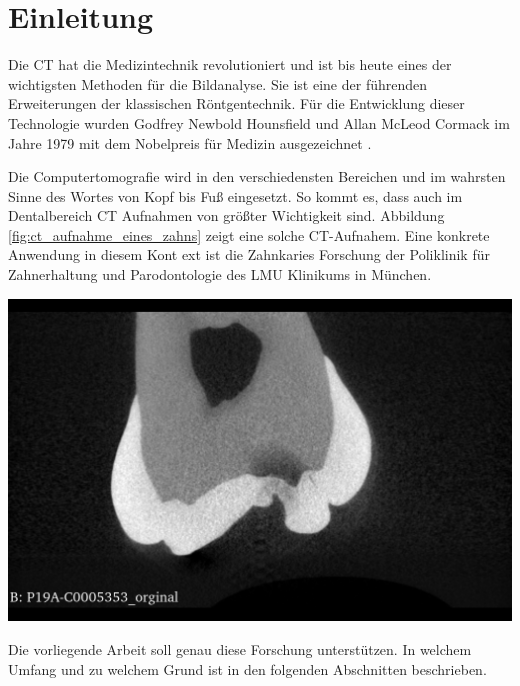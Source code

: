 \chapter{Einleitung}
\label{chap:einleitung} Die \ac{CT} hat die Medizintechnik revolutioniert und
ist bis heute eines der wichtigsten Methoden für die Bildanalyse. Sie ist eine der
führenden Erweiterungen der klassischen Röntgentechnik. Für die Entwicklung
dieser Technologie wurden Godfrey Newbold Hounsfield und Allan McLeod Cormack im
Jahre 1979 mit dem Nobelpreis für Medizin ausgezeichnet \citep[Seite12]{handels2000}.

\begin{minipage}{0.40\textwidth}
	Die Computertomografie wird in den verschiedensten Bereichen und im wahrsten Sinne
	des Wortes von Kopf bis Fuß eingesetzt. So kommt es, dass auch im Dentalbereich
	CT Aufnahmen von größter Wichtigkeit sind. Abbildung
	\ref{fig:ct_aufnahme_eines_zahns} zeigt eine solche CT-Aufnahem. Eine konkrete
	Anwendung in diesem Kont ext ist die Zahnkaries Forschung der Poliklinik für Zahnerhaltung
	und Parodontologie des LMU Klinikums in München.
\end{minipage}
\hfill
\begin{minipage}{0.50\textwidth}
	\centering
	\includegraphics[scale=0.2, width=\textwidth]{img/micro_ct_orginal.jpg}
	 \label{fig:ct_aufnahme_eines_zahns}
\end{minipage}

Die vorliegende Arbeit soll genau diese Forschung unterstützen. In welchem
Umfang und zu welchem Grund ist in den folgenden Abschnitten beschrieben.

